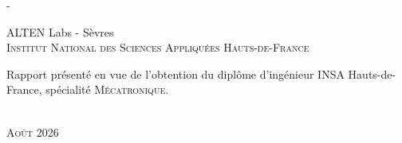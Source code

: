 \begin{titlingpage}
\begin{SingleSpace}
\begin{adjustwidth*}{\unitlength}{-\unitlength}
\begin{center}
\vfill
{\large ALTEN Labs - Sèvres\\
\textsc{Institut National des Sciences Appliquées Hauts-de-France}}\\
\vspace{6mm}
\begin{minipage}{11cm}
\centering
Rapport présenté en vue de l'obtention du diplôme d'ingénieur INSA
Hauts-de-France, spécialité \textsc{Mécatronique}.
\end{minipage}\\
\vspace{8mm}
{\large\textsc{Août 2026}}
\vspace{8mm}
\end{center}
\end{adjustwidth*}
\end{SingleSpace}
\end{titlingpage}
